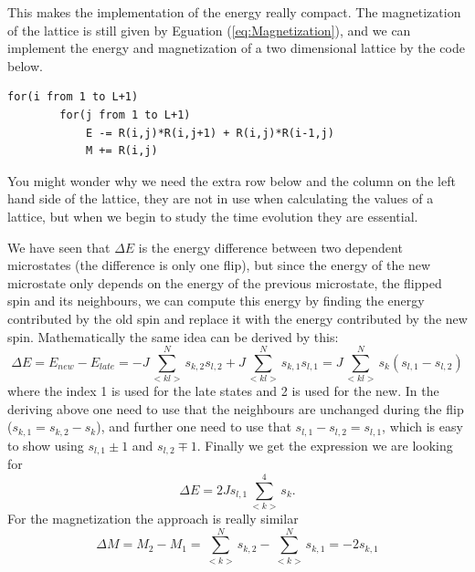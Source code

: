 \documentclass[norsk,a4paper,12pt]{article}
\begin{document}
\begin{center}
\end{center}
This makes the implementation of the energy really compact. The magnetization of the lattice is still given by Eguation (\ref{eq:Magnetization}), and we can implement the energy and magnetization of a two dimensional lattice by the code below.
\begin{lstlisting}
for(i from 1 to L+1)
        for(j from 1 to L+1)
            E -= R(i,j)*R(i,j+1) + R(i,j)*R(i-1,j)
            M += R(i,j)
\end{lstlisting}
You might wonder why we need the extra row below and the column on the left hand side of the lattice, they are not in use when calculating the values of a lattice, but when we begin to study the time evolution they are essential.\par
We have seen that $\Delta E$ is the energy difference between two dependent microstates (the difference is only one flip), but since the energy of the new microstate only depends on the energy of the previous microstate, the flipped spin and its neighbours, we can compute this energy by finding the energy contributed by the old spin and replace it with the energy contributed by the new spin. Mathematically the same idea can be derived by this:
\begin{equation*}
\Delta E=E_{new}-E_{late}=-J\sum_{<kl>}^Ns_{k,2}s_{l,2}+J\sum_{<kl>}^Ns_{k,1}s_{l,1}= J\sum_{<kl>}^Ns_k(s_{l,1}-s_{l,2})
\end{equation*}
where the index 1 is used for the late states and 2 is used for the new. In the deriving above one need to use that the neighbours are unchanged during the flip ($s_{k,1}=s_{k,2}-s_k$), and further one need to use that $s_{l,1}-s_{l,2}=s_{l,1}$, which is easy to show using $s_{l,1}\pm1$ and $s_{l,2}\mp1$. Finally we get the expression we are looking for
\begin{equation}
\Delta E=2Js_{l,1}\sum_{<k>}^4s_k.
\end{equation}
For the magnetization the approach is really similar
\begin{equation}
\Delta M=M_2-M_1=\sum_{<k>}^Ns_{k,2}-\sum_{<k>}^Ns_{k,1}=-2s_{k,1}
\end{equation}
\end{document}
